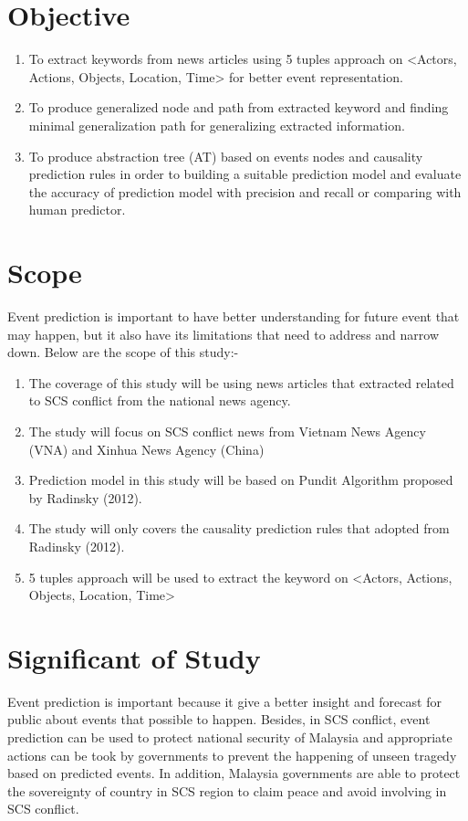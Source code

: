 \documentclass[twosides]{utmthesis}
\begin{document}
\section{Objective}
\begin{enumerate}

\item To extract keywords from news articles using 5 tuples approach on <Actors, Actions, Objects, Location, Time> for better event representation.

\item To produce generalized node and path from extracted keyword and finding minimal generalization path for generalizing extracted information.

\item To produce abstraction tree (AT) based on events nodes and causality prediction rules in order to building a suitable prediction model and evaluate the accuracy of prediction model with precision and recall or comparing with human predictor. 


\end{enumerate}

\section{Scope} 
Event prediction is important to have better understanding for future event that may happen, but it also have its limitations that need to address and narrow down. Below are the scope of this study:-
\begin{enumerate}
\item The coverage of this study will be using news articles that extracted related to SCS conflict from the national news agency. 
\item The study will focus on SCS conflict news from Vietnam News Agency (VNA) and Xinhua News Agency (China)
\item Prediction model in this study will be based on Pundit Algorithm proposed by Radinsky (2012). 
\item The study will only covers the causality prediction rules that adopted from Radinsky (2012).
\item 5 tuples approach will be used to extract the keyword on <Actors, Actions, Objects, Location, Time> 
\end{enumerate}	

\section{Significant of Study}
Event prediction is important because it give a better insight and forecast for public about events that possible to happen. Besides, in SCS conflict, event prediction can be used to protect national security of Malaysia and appropriate actions can be took by governments to prevent the happening of unseen tragedy based on predicted events. In addition, Malaysia governments are able to protect the sovereignty of country in SCS region to claim peace and avoid involving in SCS conflict.    
\end{document}
